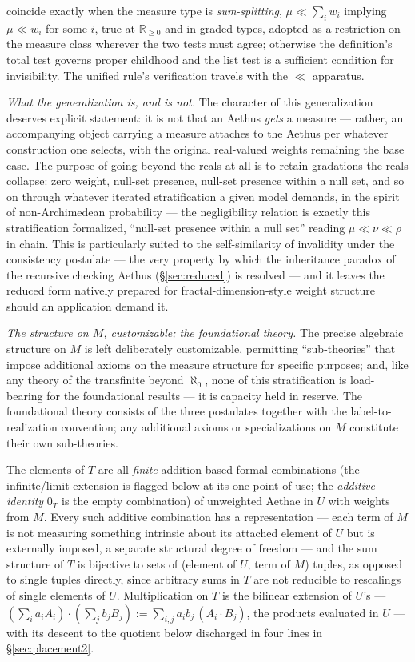 coincide exactly when the measure type is \emph{sum-splitting}, $\mu \ll \sum_i w_i$ implying $\mu \ll w_i$ for some $i$, true at $\mathbb{R}_{\ge 0}$ and in graded types, adopted as a restriction on the measure class wherever the two tests must agree; otherwise the definition's total test governs proper childhood and the list test is a sufficient condition for invisibility. The unified rule's verification travels with the $\ll$ apparatus.

\textit{What the generalization is, and is not.} The character of this generalization deserves explicit statement: it is not that an Aethus \emph{gets} a measure --- rather, an accompanying object carrying a measure attaches to the Aethus per whatever construction one selects, with the original real-valued weights remaining the base case. The purpose of going beyond the reals at all is to retain gradations the reals collapse: zero weight, null-set presence, null-set presence within a null set, and so on through whatever iterated stratification a given model demands, in the spirit of non-Archimedean probability \cite{benci2013nonarchimedean} --- the negligibility relation is exactly this stratification formalized, ``null-set presence within a null set'' reading $\mu \ll \nu \ll \rho$ in chain. This is particularly suited to the self-similarity of invalidity under the consistency postulate --- the very property by which the inheritance paradox of the recursive checking Aethus (§\ref{sec:reduced}) is resolved --- and it leaves the reduced form natively prepared for fractal-dimension-style weight structure should an application demand it.

\textit{The structure on $M$, customizable; the foundational theory.} The precise algebraic structure on $M$ is left deliberately customizable, permitting ``sub-theories'' that impose additional axioms on the measure structure for specific purposes; and, like any theory of the transfinite beyond $\aleph_0$, none of this stratification is load-bearing for the foundational results --- it is capacity held in reserve. The foundational theory consists of the three postulates together with the label-to-realization convention; any additional axioms or specializations on $M$ constitute their own sub-theories.

The elements of $T$ are all \emph{finite} addition-based formal combinations (the infinite/limit extension is flagged below at its one point of use; the \emph{additive identity} $0_T$ is the empty combination) of unweighted Aethae in $U$ with weights from $M$. Every such additive combination has a representation --- each term of $M$ is not measuring something intrinsic about its attached element of $U$ but is externally imposed, a separate structural degree of freedom --- and the sum structure of $T$ is bijective to sets of (element of $U$, term of $M$) tuples, as opposed to single tuples directly, since arbitrary sums in $T$ are not reducible to rescalings of single elements of $U$. Multiplication on $T$ is the bilinear extension of $U$'s --- $(\sum_i a_i A_i) \cdot (\sum_j b_j B_j) := \sum_{i,j} a_i b_j \,(A_i \cdot B_j)$, the products evaluated in $U$ --- with its descent to the quotient below discharged in four lines in §\ref{sec:placement2}.

